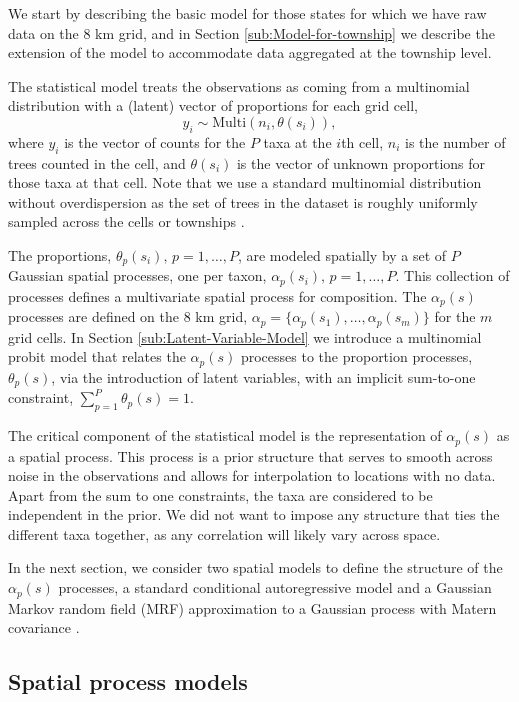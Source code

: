 \documentclass[12pt]{article}\usepackage[]{graphicx}\usepackage[]{color}
\begin{document}
We start by describing the basic model for those states for which
we have raw data on the 8 km grid, and in Section \ref{sub:Model-for-township}
we describe the extension of the model to accommodate data aggregated
at the township level.

The statistical model treats the observations as coming from a multinomial
distribution with a (latent) vector of proportions for each grid cell,
\[
y_{i}\sim\mbox{Multi}(n_{i},\theta(s_{i})),
\]
where $y_{i}$ is the vector of counts for the $P$ taxa at the $i$th
cell, $n_{i}$ is the number of trees counted in the cell, and $\theta(s_{i})$
is the vector of unknown proportions for those taxa at that cell.
Note that we use a standard multinomial distribution without overdispersion
as the set of trees in the dataset is roughly uniformly sampled across
the cells or townships \citep{Gori:etal:2015}.

The proportions, $\theta_{p}(s_{i}),\, p=1,\ldots,P$, are modeled
spatially by a set of $P$ Gaussian spatial processes, one per taxon,
$\alpha_{p}(s_{i}),\, p=1,\ldots,P$. This collection of processes
defines a multivariate spatial process for composition. The $\alpha_{p}(s)$
processes are defined on the 8 km grid, $\alpha_{p}=\{\alpha_{p}(s_{1}),\ldots,\alpha_{p}(s_{m})\}$
for the $m$ grid cells. In Section \ref{sub:Latent-Variable-Model}
we introduce a multinomial probit model that relates the $\alpha_{p}(s)$
processes to the proportion processes, $\theta_{p}(s)$, via the introduction
of latent variables, with an implicit sum-to-one constraint, $\sum_{p=1}^{P}\theta_{p}(s)=1$.



The critical component of the statistical model is the representation
of $\alpha_{p}(s)$ as a spatial process. This process is a prior
structure that serves to smooth across noise in the observations and
allows for interpolation to locations with no data. Apart from the
sum to one constraints, the taxa are considered to be independent
in the prior. We did not want to impose any structure that ties the
different taxa together, as any correlation will likely vary across
space.

In the next section, we consider two spatial models to define the
structure of the $\alpha_{p}(s)$ processes, a standard conditional
autoregressive model \citep{Bane:etal:2003} and a Gaussian Markov
random field (MRF) approximation to a Gaussian process with Matern
covariance \citep{Lind:etal:2011}. 


\subsection{Spatial process models}
\end{document}
